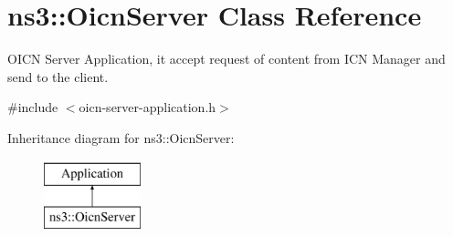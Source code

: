 \hypertarget{classns3_1_1OicnServer}{\section{ns3\-:\-:Oicn\-Server Class Reference}
\label{classns3_1_1OicnServer}
}


O\-I\-C\-N Server Application, it accept request of content from I\-C\-N Manager and send to the client.  




{\ttfamily \#include $<$oicn-\/server-\/application.\-h$>$}

Inheritance diagram for ns3\-:\-:Oicn\-Server\-:\begin{figure}[H]
\begin{center}
\leavevmode
\includegraphics[height=2.000000cm]{classns3_1_1OicnServer}
\end{center}
\end{figure}
